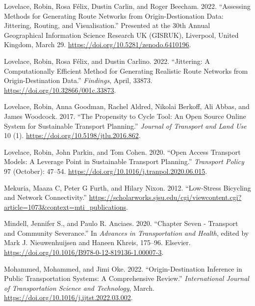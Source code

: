 \documentclass{isprs} %
\newlength{\cslhangindent}
\newlength{\cslentryspacingunit} %
\newenvironment{CSLReferences}[2] %
 {%
  \setlength{\parindent}{0pt}
  \ifodd #1
  \let\oldpar\par
  \def\par{\hangindent=\cslhangindent\oldpar}
  \fi
  \setlength{\parskip}{#2\cslentryspacingunit}
 }%
 {}
\begin{document}
\begin{CSLReferences}{1}{0}
\leavevmode{}%
Lovelace, Robin, Rosa Félix, Dustin Carlin, and Roger Beecham. 2022. {``Assessing Methods for Generating Route Networks from Origin-Destionation Data: Jittering, Routing, and Visualisation.''} Presented at the 30th {Annual Geographical Information Science Research UK} ({GISRUK}), {Liverpool, United Kingdom}, March 29. \url{https://doi.org/10.5281/zenodo.6410196}.

\leavevmode{}%
Lovelace, Robin, Rosa Félix, and Dustin Carlino. 2022. {``Jittering: {A Computationally Efficient Method} for {Generating Realistic Route Networks} from {Origin-Destination Data}.''} \emph{Findings}, April, 33873. \url{https://doi.org/10.32866/001c.33873}.

\leavevmode{}%
Lovelace, Robin, Anna Goodman, Rachel Aldred, Nikolai Berkoff, Ali Abbas, and James Woodcock. 2017. {``The {Propensity} to {Cycle Tool}: {An} Open Source Online System for Sustainable Transport Planning.''} \emph{Journal of Transport and Land Use} 10 (1). \url{https://doi.org/10.5198/jtlu.2016.862}.

\leavevmode{}%
Lovelace, Robin, John Parkin, and Tom Cohen. 2020. {``Open Access Transport Models: {A} Leverage Point in Sustainable Transport Planning.''} \emph{Transport Policy} 97 (October): 47--54. \url{https://doi.org/10.1016/j.tranpol.2020.06.015}.

\leavevmode{}%
Mekuria, Maaza C, Peter G Furth, and Hilary Nixon. 2012. {``Low-Stress Bicycling and Network Connectivity.''} \url{https://scholarworks.sjsu.edu/cgi/viewcontent.cgi?article=1073\&context=mti_publications}.

\leavevmode{}%
Mindell, Jennifer S., and Paulo R. Anciaes. 2020. {``Chapter Seven - {Transport} and Community Severance.''} In \emph{Advances in {Transportation} and {Health}}, edited by Mark J. Nieuwenhuijsen and Haneen Khreis, 175--96. {Elsevier}. \url{https://doi.org/10.1016/B978-0-12-819136-1.00007-3}.

\leavevmode{}%
Mohammed, Mohammed, and Jimi Oke. 2022. {``Origin-Destination Inference in Public Transportation Systems: {A} Comprehensive Review.''} \emph{International Journal of Transportation Science and Technology}, March. \url{https://doi.org/10.1016/j.ijtst.2022.03.002}.


\end{CSLReferences}
\end{document}
